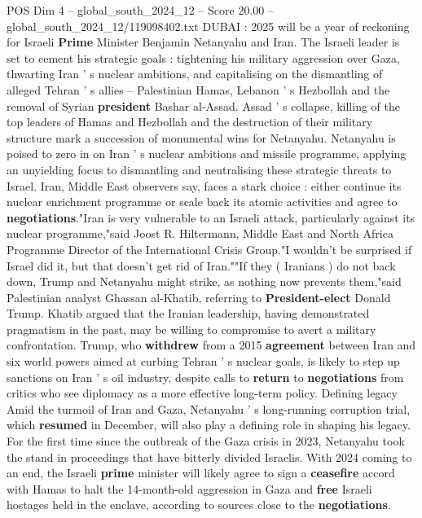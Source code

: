 \begin{textsample}{POS Dim 4 – global\_south\_2024\_12 – Score 20.00 – global\_south\_2024\_12/119098402.txt}  \label{ex:f4_pos_235}
DUBAI : 2025 will be a year of reckoning for Israeli \textbf{Prime} Minister Benjamin Netanyahu and Iran.
The Israeli leader is set to cement his strategic goals : tightening his military aggression over Gaza, thwarting Iran ' s nuclear ambitions, and capitalising on the dismantling of alleged Tehran ' s allies -- Palestinian Hamas, Lebanon ' s Hezbollah and the removal of Syrian \textbf{president} Bashar al-Assad.
Assad ' s collapse, killing of the top leaders of Hamas and Hezbollah and the destruction of their military structure mark a succession of monumental wins for Netanyahu.
Netanyahu is poised to zero in on Iran ' s nuclear ambitions and missile programme, applying an unyielding focus to dismantling and neutralising these strategic threats to Israel.
Iran, Middle East observers say, faces a stark choice : either continue its nuclear enrichment programme or scale back its atomic activities and agree to \textbf{negotiations}."Iran is very vulnerable to an Israeli attack, particularly against its nuclear programme,"said Joost R.
Hiltermann, Middle East and North Africa Programme Director of the International Crisis Group."I wouldn't be surprised if Israel did it, but that doesn't get rid of Iran.""If they ( Iranians ) do not back down, Trump and Netanyahu might strike, as nothing now prevents them,"said Palestinian analyst Ghassan al-Khatib, referring to \textbf{President-elect} Donald Trump.
Khatib argued that the Iranian leadership, having demonstrated pragmatism in the past, may be willing to compromise to avert a military confrontation.
Trump, who \textbf{withdrew} from a 2015 \textbf{agreement} between Iran and six world powers aimed at curbing Tehran ' s nuclear goals, is likely to step up sanctions on Iran ' s oil industry, despite calls to \textbf{return} to \textbf{negotiations} from critics who see diplomacy as a more effective long-term policy.
Defining legacy Amid the turmoil of Iran and Gaza, Netanyahu ' s long-running corruption trial, which \textbf{resumed} in December, will also play a defining role in shaping his legacy.
For the first time since the outbreak of the Gaza crisis in 2023, Netanyahu took the stand in proceedings that have bitterly divided Israelis.
With 2024 coming to an end, the Israeli \textbf{prime} minister will likely agree to sign a \textbf{ceasefire} accord with Hamas to halt the 14-month-old aggression in Gaza and \textbf{free} Israeli hostages held in the enclave, according to sources close to the \textbf{negotiations}.

\end{textsample}
